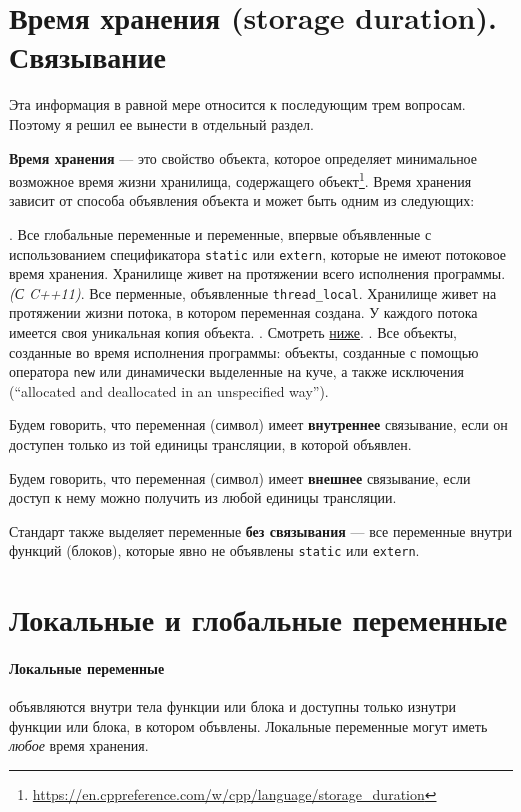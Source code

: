 \section*{Время хранения (storage duration). Связывание}
Эта информация в равной мере относится к последующим трем вопросам. Поэтому я решил ее
вынести в отдельный раздел.

\textbf{Время хранения} --- это свойство объекта, которое определяет минимальное
возможное время жизни хранилища, содержащего объект\footnote{\url{https://en.cppreference.com/w/cpp/language/storage_duration}}.
Время хранения зависит от способа объявления объекта и может быть одним из следующих:

\begin{itemize}
  . Все глобальные переменные и переменные, впервые объявленные с использованием
  спецификатора \verb|static| или \verb|extern|, которые не имеют потоковое время хранения.
  Хранилище живет на протяжении всего исполнения программы.
   {\small\textit{(С C++11)}}. Все перменные, объявленные \verb|thread_local|.
  Хранилище живет на протяжении жизни потока, в котором переменная создана. У каждого потока имеется
  своя уникальная копия объекта.
  . Смотреть \hyperref[def:auto_storage]{ниже}.
  . Все объекты, созданные во время исполнения программы:
  объекты, созданные с помощью оператора \verb|new| или динамически выделенные на куче,
  а также исключения (``allocated and deallocated in an unspecified way'').
\end{itemize}

Будем говорить, что переменная (символ) имеет \textbf{внутреннее} связывание, если он доступен
только из той единицы трансляции, в которой объявлен.

Будем говорить, что переменная (символ) имеет \textbf{внешнее} связывание, если доступ к нему
можно получить из любой единицы трансляции.

Стандарт также выделяет переменные \textbf{без связывания} --- все переменные внутри функций (блоков),
которые явно не объявлены \verb|static| или \verb|extern|.

\section{Локальные и глобальные переменные}
\paragraph{Локальные переменные} объявляются внутри тела функции или блока и доступны только изнутри
функции или блока, в котором объвлены. Локальные переменные могут иметь \textit{любое} время хранения.

